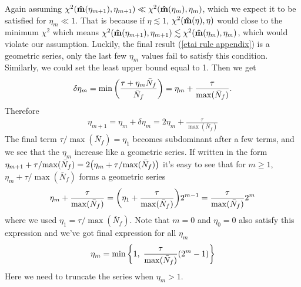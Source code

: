 \documentclass[11pt, letterpaper]{article}
\newcommand{\hatm}{\vb{\hat{m}}}
\newcommand{\Nbar}{\bar{N}}
\begin{document}
Again assuming $\chi^2(\hatm(\eta_{m+1}), \eta_{m+1}) \ll \chi^2(\hatm(\eta_m), \eta_m)$,
which we expect it to be satisfied for $ \eta_m \ll 1$.
That is because if $\eta \lesssim 1$, $\chi^2(\hatm(\eta), \eta)$ would close to the minimum $\chi^2$
which means $\chi^2(\hatm(\eta_{m+1}), \eta_{m+1}) \lesssim \chi^2(\hatm(\eta_m), \eta_m)$,
which would violate our assumption.
Luckily, the final result (\ref{etai rule appendix}) is a geometric series,
only the last few $\eta_m$ values fail to satisfy this condition.
Similarly, we could set the least upper bound equal to 1.
Then we get
\begin{align}
\delta \eta_m 
= \min \qty(\frac{\tau + \eta_m \Nbar_f}{\Nbar_f})
= \eta_m + \frac{\tau }{\max(\Nbar_f)}.
\end{align}
Therefore 
\begin{align}
\eta_{m+1} = \eta_m + \delta\eta_m = 2\eta_m + \frac{\tau }{\max (\Nbar_f)}
\end{align}
The final term ${\tau }/{\max (\Nbar_f)} = \eta_1$ becomes subdominant after a few terms, and we see that the $\eta_m$ increase like a geometric series. 
If written in the form $\eta_{m+1} + {\tau }/{\max(\Nbar_f)}
= 2 \qty( \eta_m + {\tau}/{\max(\Nbar_f)})$
it's easy to see that for $m \geq 1$,
$\eta_{m} + {\tau }/{\max(\Nbar_f)}$ forms a geometric series
\begin{align}
\eta_m +  \frac{\tau }{\max(\Nbar_f)}
=\qty(\eta_1 + \frac{\tau }{\max(\Nbar_f)}) 2^{m-1}
=\frac{\tau}{\max(\Nbar_f)} 2^m
\end{align}
where we used $\eta_1 = {\tau}/{\max(\bar{N}_f)}$.
Note that $m = 0$ and $\eta_0 = 0$ also satisfy this expression and we've got
final expression for all $\eta_m$
\begin{align}
\eta_m =\min \qty\bigg{1,\; \frac{\tau}{\max(\Nbar_f)} \qty(2^m -1) }
\label{etai rule}
\end{align}
Here we need to truncate the series when $\eta_m > 1$.
\end{document}
